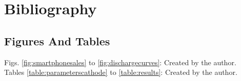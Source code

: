 \documentclass[12pt, a4paper]{article}
\begin{document}
% 



\newpage

\tableofcontents

\newpage

\newpage

\newpage

\newpage

\newpage

\newpage

\newpage

\newpage

\newpage

\section{Bibliography}
\printbibliography

\subsection{Figures And Tables}
Figs. \ref{fig:smartphonesales} to \ref{fig:dischargecurves}: Created by the author.\\
Tables \ref{table:parameterscathode} to \ref{table:results}: Created by the author.
\end{document}
